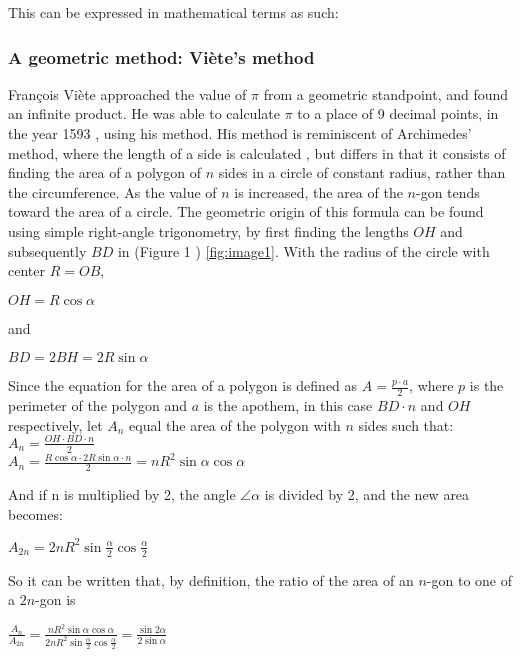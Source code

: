This can be expressed in mathematical terms as such: 





\subsubsection{A geometric method: Viète's method}

François Viète approached the value of $\pi$ from a 
geometric standpoint, and found an infinite product. 
He was able to calculate $\pi$ to a place of 9 decimal points, in 
the year 1593 \cite{Kreminski}, using his method. His method is reminiscent 
of Archimedes' method, where the length of a side is calculated \cite{archimedespi}, 
but differs in that it consists of finding the area of a polygon of $n$ sides in a circle of constant 
radius, rather than the circumference. As the value of $n$ is increased, the area of the $n$-gon 
tends toward the area of a circle. The geometric origin of this formula 
can be found using simple right-angle trigonometry, by first finding 
the lengths $OH$ and subsequently $BD$ in (Figure 1 ) \ref{fig:image1}.
With the radius of the circle with center $R = OB$,

$OH = R \cos{\alpha}$ 

and

$BD = 2BH = 2 R \sin{\alpha}$

Since the equation for the area of a polygon is defined as $A = \frac{p \cdot a}{2}$, 
where $p$ is the perimeter of the polygon and $a$ is the apothem, in this case $BD \cdot n$ 
and $OH$ respectively, let $A_{n}$ equal the area of 
the polygon with $n$ sides such that: \\
$A_{n} = \frac{OH \cdot BD \cdot n}{2}$ \\
$A_{n} = \frac{R \cos{\alpha} \cdot 2 R \sin{\alpha} \cdot n}{2} = n R^2 \sin{\alpha} \cos{\alpha}$

And if n is multiplied by 2, the angle $\angle \alpha$ is divided by 2, 
and the new area becomes: 

$A_{2n} = 2n R^2 \sin{\frac{\alpha}{2}} \cos{\frac{\alpha}{2}}$

So it can be written that, by definition, the ratio of 
the area of an $n$-gon to one of a $2n$-gon is

$\frac{A_{n}}{A_{2n}} = \frac{n R^2 \sin{\alpha} \cos{\alpha}}{2 n R^2 \sin{\frac{\alpha}{2}} \cos{\frac{\alpha}{2}}} = \frac{\sin{2 \alpha}}{2 \sin{\alpha}}$

